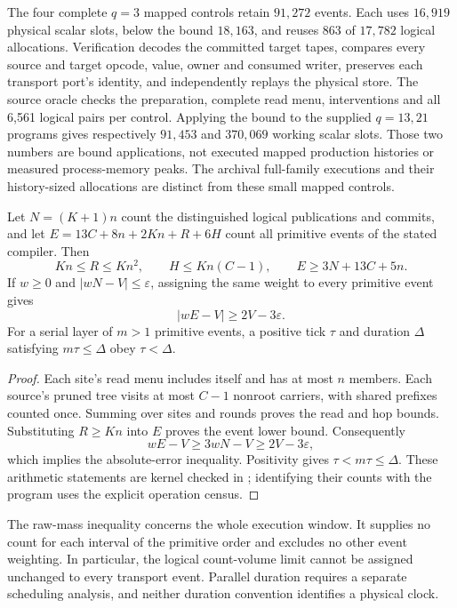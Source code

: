 The four complete $q=3$ mapped controls retain $91{,}272$ events. Each
uses $16{,}919$ physical scalar slots, below the bound $18{,}163$, and
reuses 863 of $17{,}782$ logical allocations. Verification decodes the
committed target tapes, compares every source and target opcode, value,
owner and consumed writer, preserves each transport port's identity,
and independently replays the physical store. The source oracle checks
the preparation, complete read menu, interventions and all 6,561 logical
pairs per control. Applying the bound to the supplied $q=13,21$ programs
gives respectively $91{,}453$ and $370{,}069$ working scalar slots.
Those two numbers are bound applications, not executed mapped production
histories or measured process-memory peaks. The archival full-family
executions and their history-sized allocations are distinct from these
small mapped controls.

\begin{proposition}
\label{prop:source-routing-raw-count}
Let $N=(K+1)n$ count the distinguished logical publications and commits,
and let $E=13C+8n+2Kn+R+6H$ count all primitive events of the stated
compiler. Then
\[
 Kn\leq R\leq Kn^2,\qquad H\leq Kn(C-1),\qquad
 E\geq3N+13C+5n.
\]
If $w\geq0$ and $|wN-V|\leq\varepsilon$, assigning the same weight to
every primitive event gives
\[
 |wE-V|\geq2V-3\varepsilon.
\]
For a serial layer of $m>1$ primitive events, a positive tick $\tau$ and
duration $\Delta$ satisfying $m\tau\leq\Delta$ obey $\tau<\Delta$.
\end{proposition}
\begin{proof}
Each site's read menu includes itself and has at most $n$ members.
Each source's pruned tree visits at most $C-1$ nonroot carriers, with
shared prefixes counted once. Summing over sites and rounds proves the
read and hop bounds. Substituting $R\geq Kn$ into $E$ proves the event
lower bound. Consequently
\[
 wE-V\geq3wN-V\geq2V-3\varepsilon,
\]
which implies the absolute-error inequality. Positivity gives
$\tau<m\tau\leq\Delta$. These arithmetic statements are kernel
checked in ; identifying
their counts with the program uses the explicit operation census.
\end{proof}
The raw-mass inequality concerns the whole execution window. It supplies
no count for each interval of the primitive order and excludes no other
event weighting. In particular, the logical count-volume limit cannot
be assigned unchanged to every transport event. Parallel duration
requires a separate scheduling analysis, and neither duration convention
identifies a physical clock.

